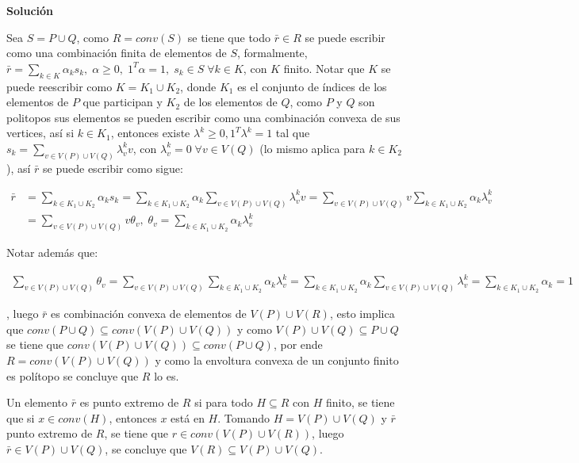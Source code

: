 \documentclass{article}
\theoremstyle{plain}
\theoremstyle{definition}
\theoremstyle{Azul}
\begin{document}
\begin{enumerate}[(a)]
\textbf{Solución}

 Sea $S=P\cup Q$, como $R=conv(S)$ se tiene que todo $\bar{r}\in R$ se puede escribir como una combinación finita de elementos de $S$, formalmente, $\bar{r}=\sum_{k\in K}\alpha_{k}s_{k}, \; \alpha\geq 0, \; 1^{T}\alpha=1, \;s_{k}\in S \; \forall k \in K$, con $K$ finito. Notar que $K$ se puede reescribir como $K=K_{1}\cup K_{2}$, donde $K_{1}$ es el conjunto de índices de los elementos de $P$ que participan y $K_{2}$ de los elementos de $Q$, como $P$ y $Q$ son politopos sus elementos se pueden escribir como una combinación convexa de sus vertices, así si $k\in K_{1}$, entonces existe $\lambda^{k}\geq 0, 1^{T}\lambda^{k}=1$ tal que  $s_{k} = \sum_{v \in V(P)\cup V(Q)}\lambda^{k}_{v}v$, con $\lambda^{k}_{v}=0 \; \forall v\in V(Q)$ (lo mismo aplica para $k\in K_{2}$), así $\bar{r}$ se puede escribir como sigue:

\begin{align*}
\bar{r} & = \sum_{k\in K_{1}\cup K_{2}}\alpha_{k}s_{k}= \sum_{k\in K_{1}\cup K_{2}}\alpha_{k}\sum_{v\in V(P)\cup V(Q)}\lambda^{k}_{v}v  = \sum_{v\in V(P)\cup V(Q)} v \sum_{k\in K_{1}\cup K_{2}}\alpha_{k}\lambda^{k}_{v}\\
& = \sum_{v\in V(P)\cup V(Q)}v \theta_{v},\; \theta_{v} = \sum_{k\in K_{1}\cup K_{2}}\alpha_{k}\lambda^{k}_{v}
\end{align*}

Notar además que:

\begin{align*}
    \sum_{v\in V(P)\cup V(Q)}\theta_{v} = \sum_{v\in V(P)\cup V(Q)} \sum_{k\in K_{1}\cup K_{2}}\alpha_{k}\lambda^{k}_{v} =  \sum_{k\in K_{1}\cup K_{2}}\alpha_{k} \sum_{v\in V(P)\cup V(Q)}\lambda^{k}_{v}  =  \sum_{k\in K_{1}\cup K_{2}}\alpha_{k} = 1
\end{align*}

, luego $\bar{r}$ es combinación convexa de elementos de $V(P)\cup V(R)$, esto implica que $conv(P\cup Q) \subseteq conv(V(P)\cup V(Q))$ y como $V(P)\cup V(Q) \subseteq P\cup Q$ se tiene que $conv(V(P)\cup V(Q))\subseteq conv(P\cup Q)$, por ende $R=conv(V(P)\cup V(Q))$ y como la envoltura convexa de un conjunto finito es polítopo se concluye que $R$ lo es.

Un elemento $\bar{r}$ es punto extremo de $R$ si para todo $H\subseteq R$ con $H$ finito, se tiene que si $x\in conv(H)$, entonces $x$ está en $H$. Tomando $H = V(P)\cup V(Q)$ y $\bar{r}$ punto extremo de $R$, se tiene que $r\in conv(V(P)\cup V(R))$, luego $\bar{r}\in V(P)\cup V(Q)$, se concluye que $V(R)\subseteq V(P)\cup V(Q)$.


\end{enumerate}
\end{document}

